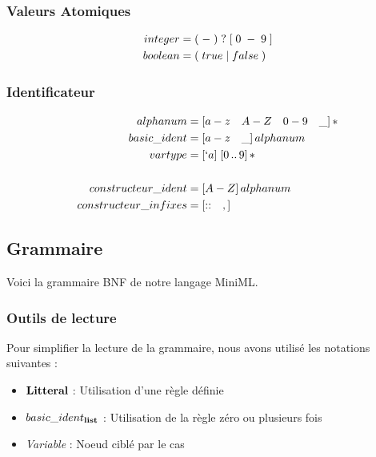 \documentclass[
  12pt,
]{article}
\providecommand{\tightlist}{%
  \setlength{\itemsep}{0pt}\setlength{\parskip}{0pt}}
\begin{document}
\hypertarget{valeurs-atomiques}{%
  \subsubsection{Valeurs Atomiques}\label{valeurs-atomiques}}

\begin{align*}
  integer & = (\;-\;)\;?\;[\;0\;-\;9\;]\* \\
  boolean & = (\;true\;|\;false\;)
\end{align*}

\hypertarget{identificateur}{%
  \subsubsection{Identificateur}\label{identificateur}}

\begin{align*}
  alphanum              & = [a-z \quad A-Z \quad 0-9 \quad \_]\,* \\
  basic\_ident          & = [a-z \quad \_] \, alphanum            \\
  vartype               & = [`a] \; [0 \, .. \, 9]\,*\            \\
  \\
  constructeur\_ident   & = [A-Z] \, alphanum                     \\
  constructeur\_infixes & = [:: \quad ,]
\end{align*}

\pagebreak

\hypertarget{grammaire}{%
  \subsection{Grammaire}\label{grammaire}}

Voici la grammaire BNF de notre langage MiniML.

\hypertarget{outils-de-lecture}{%
  \subsubsection{Outils de lecture}\label{outils-de-lecture}}

Pour simplifier la lecture de la grammaire, nous avons utilisé les
notations suivantes :

\begin{itemize}
  \tightlist
  \item
        \(\bf{Litteral}\) : Utilisation d'une règle définie
  \item
        \(basic\_ident_{\bf{list}}\) : Utilisation de la règle zéro ou
        plusieurs fois
  \item
        \textit{Variable} : Noeud ciblé par le cas
\end{itemize}
\end{document}
